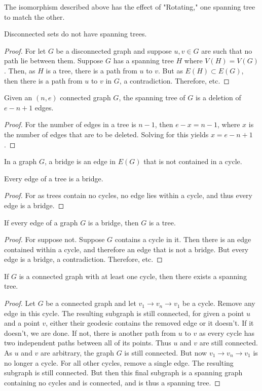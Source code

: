 \documentclass[crop=false,class=book,oneside]{standalone}
\begin{document}
\begin{remark}
The isomorphism described above has the effect of "Rotating," one spanning tree to match the other.
\end{remark}
\begin{theorem}
Disconnected sets do not have spanning trees.
\end{theorem}
\begin{proof}
For let $G$ be a disconnected graph and suppose $u,v\in G$ are such that no path lie between them. Suppose $G$ has a spanning tree $H$ where $V(H)=V(G)$. Then, as $H$ is a tree, there is a path from $u$ to $v$. But as $E(H)\subset E(G)$, then there is a path from $u$ to $v$ in $G$, a contradiction. Therefore, etc.
\end{proof}
\begin{theorem}
Given an $(n,e)$ connected graph $G$, the spanning tree of $G$ is a deletion of $e-n+1$ edges.
\end{theorem}
\begin{proof}
For the number of edges in a tree is $n-1$, then $e-x = n-1$, where $x$ is the number of edges that are to be deleted. Solving for this yields $x=e-n+1$.
\end{proof}
\begin{definition}
In a graph $G$, a bridge is an edge in $E(G)$ that is not contained in a cycle.
\end{definition}
\begin{corollary}
Every edge of a tree is a bridge.
\end{corollary}
\begin{proof}
For as trees contain no cycles, no edge lies within a cycle, and thus every edge is a bridge.
\end{proof}
\begin{corollary}
If every edge of a graph $G$ is a bridge, then $G$ is a tree.
\end{corollary}
\begin{proof}
For suppose not. Suppose $G$ contains a cycle in it. Then there is an edge contained within a cycle, and therefore an edge that is not a bridge. But every edge is a bridge, a contradiction. Therefore, etc.
\end{proof}
\begin{theorem}
If $G$ is a connected graph with at least one cycle, then there exists a spanning tree.
\end{theorem}
\begin{proof}
Let $G$ be a connected graph and let $v_1 \rightarrow v_n\rightarrow v_1$ be a cycle. Remove any edge in this cycle. The resulting subgraph is still connected, for given a point $u$ and a point $v$, either their geodesic contains the removed edge or it doesn't. If it doesn't, we are done. If not, there is another path from $u$ to $v$ as every cycle has two independent paths between all of its points. Thus $u$ and $v$ are still connected. As $u$ and $v$ are arbitrary, the graph $G$ is still connected. But now $v_1\rightarrow v_n \rightarrow v_1$ is no longer a cycle. For all other cycles, remove a single edge. The resulting subgraph is still connected. But then this final subgraph is a spanning graph containing no cycles and is connected, and is thus a spanning tree.
\end{proof}
\end{document}
